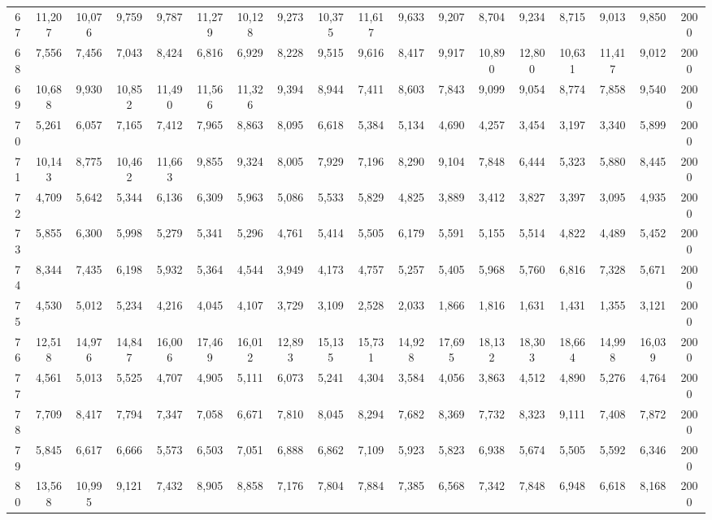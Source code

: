 {\begin{longtable}{ >{\tiny}cccccccccccccccccc}
67  & 11,207 & 10,076 & 9,759  & 9,787  & 11,279 & 10,128 & 9,273  & 10,375 & 11,617 & 9,633  & 9,207  & 8,704  & 9,234  & 8,715  & 9,013  & 9,850  & 2000 \\
68  & 7,556  & 7,456  & 7,043  & 8,424  & 6,816  & 6,929  & 8,228  & 9,515  & 9,616  & 8,417  & 9,917  & 10,890 & 12,800 & 10,631 & 11,417 & 9,012  & 2000 \\
69  & 10,688 & 9,930  & 10,852 & 11,490 & 11,566 & 11,326 & 9,394  & 8,944  & 7,411  & 8,603  & 7,843  & 9,099  & 9,054  & 8,774  & 7,858  & 9,540  & 2000 \\
70  & 5,261  & 6,057  & 7,165  & 7,412  & 7,965  & 8,863  & 8,095  & 6,618  & 5,384  & 5,134  & 4,690  & 4,257  & 3,454  & 3,197  & 3,340  & 5,899  & 2000 \\
71  & 10,143 & 8,775  & 10,462 & 11,663 & 9,855  & 9,324  & 8,005  & 7,929  & 7,196  & 8,290  & 9,104  & 7,848  & 6,444  & 5,323  & 5,880  & 8,445  & 2000 \\
72  & 4,709  & 5,642  & 5,344  & 6,136  & 6,309  & 5,963  & 5,086  & 5,533  & 5,829  & 4,825  & 3,889  & 3,412  & 3,827  & 3,397  & 3,095  & 4,935  & 2000 \\
73  & 5,855  & 6,300  & 5,998  & 5,279  & 5,341  & 5,296  & 4,761  & 5,414  & 5,505  & 6,179  & 5,591  & 5,155  & 5,514  & 4,822  & 4,489  & 5,452  & 2000 \\
74  & 8,344  & 7,435  & 6,198  & 5,932  & 5,364  & 4,544  & 3,949  & 4,173  & 4,757  & 5,257  & 5,405  & 5,968  & 5,760  & 6,816  & 7,328  & 5,671  & 2000 \\
75  & 4,530  & 5,012  & 5,234  & 4,216  & 4,045  & 4,107  & 3,729  & 3,109  & 2,528  & 2,033  & 1,866  & 1,816  & 1,631  & 1,431  & 1,355  & 3,121  & 2000 \\
76  & 12,518 & 14,976 & 14,847 & 16,006 & 17,469 & 16,012 & 12,893 & 15,135 & 15,731 & 14,928 & 17,695 & 18,132 & 18,303 & 18,664 & 14,998 & 16,039 & 2000 \\
77  & 4,561  & 5,013  & 5,525  & 4,707  & 4,905  & 5,111  & 6,073  & 5,241  & 4,304  & 3,584  & 4,056  & 3,863  & 4,512  & 4,890  & 5,276  & 4,764  & 2000 \\
78  & 7,709  & 8,417  & 7,794  & 7,347  & 7,058  & 6,671  & 7,810  & 8,045  & 8,294  & 7,682  & 8,369  & 7,732  & 8,323  & 9,111  & 7,408  & 7,872  & 2000 \\
79  & 5,845  & 6,617  & 6,666  & 5,573  & 6,503  & 7,051  & 6,888  & 6,862  & 7,109  & 5,923  & 5,823  & 6,938  & 5,674  & 5,505  & 5,592  & 6,346  & 2000 \\
80  & 13,568 & 10,995 & 9,121  & 7,432  & 8,905  & 8,858  & 7,176  & 7,804  & 7,884  & 7,385  & 6,568  & 7,342  & 7,848  & 6,948  & 6,618  & 8,168  & 2000 \\

\end{longtable}}
